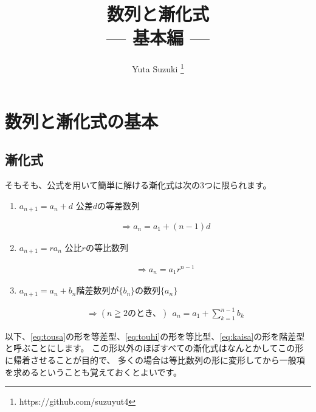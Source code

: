 \documentclass[a4paper]{ltjsarticle}
\title{
  {\Large 数列と漸化式} \\
  --- 基本編 ---
}
\author{
  Yuta Suzuki
  \thanks{https://github.com/suzuyut4}
}
\date{}
\begin{document}
\maketitle

\section{数列と漸化式の基本}

\subsection{漸化式}
そもそも、公式を用いて簡単に解ける漸化式は次の3つに限られます。

\begin{enumerate}[label=(\roman*)]
  \item
  $a_{n+1} = a_n + d$  \rightarrow 公差$d$の等差数列
  \begin{fleqn}[20pt]
    \begin{align}
      \Rightarrow a_n = a_1 + (n-1)d \label{eq:tousa}
    \end{align}
  \end{fleqn}
  \item
  $a_{n+1} = ra_n$     \rightarrow 公比$r$の等比数列
  \begin{fleqn}[20pt]
    \begin{align}
      \Rightarrow a_n = a_1 r^{n-1} \label{eq:touhi}
    \end{align}
  \end{fleqn}
  \item
  $a_{n+1} = a_n + b_n$\rightarrow 階差数列が$\{b_n\}$の数列$\{a_n\}$
  \begin{fleqn}[20pt]
    \begin{align}
      \Rightarrow (n\geqq 2 \text{のとき、})\:\:a_n = a_1 + \sum_{k=1}^{n-1}b_k \label{eq:kaisa}
    \end{align}
  \end{fleqn}
\end{enumerate}
以下、\eqref{eq:tousa}の形を等差型、\eqref{eq:touhi}の形を等比型、\eqref{eq:kaisa}の形を階差型
と呼ぶことにします。
この形以外のほぼすべての漸化式はなんとかしてこの形に帰着させることが目的で、
多くの場合は等比数列の形に変形してから一般項を求めるということも覚えておくとよいです。
\end{document}

